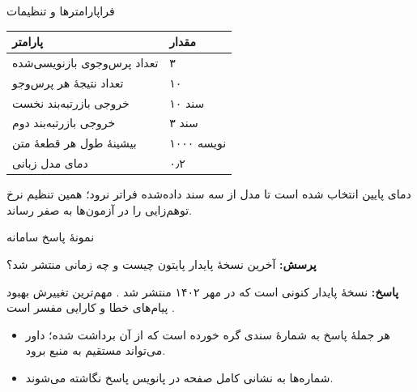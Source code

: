 \begin{frame}[noframenumbering]{فراپارامترها و تنظیمات}
  \begin{center}
    \small
    \begin{tabular}{@{}ll@{}}
      \toprule
      پارامتر & مقدار \\
      \midrule
      تعداد پرس‌وجوی بازنویسی‌شده          & ۳ \\
      تعداد نتیجهٔ هر پرس‌وجو              & ۱۰ \\
      خروجی بازرتبه‌بند نخست               & ۱۰ سند \\
      خروجی بازرتبه‌بند دوم                & ۳ سند \\
      بیشینهٔ طول هر قطعهٔ متن             & ۱۰۰۰ نویسه \\
      دمای مدل زبانی                       & ۰٫۲ \\
      \bottomrule
    \end{tabular}
  \end{center}

  \begin{PTnote}
    دمای پایین انتخاب شده است تا مدل از سه سند داده‌شده فراتر نرود؛ همین تنظیم
    نرخ توهم‌زایی را در آزمون‌ها به صفر رساند.
  \end{PTnote}
\end{frame}

\begin{frame}[noframenumbering]{نمونهٔ پاسخ سامانه}
  \begin{PTexample}
    \textbf{پرسش:} آخرین نسخهٔ پایدار پایتون چیست و چه زمانی منتشر شد؟

    \medskip
    \textbf{پاسخ:} نسخهٔ پایدار کنونی  است \soft{[۱]} که در
    مهر ۱۴۰۲ منتشر شد \soft{[۲]}. مهم‌ترین تغییرش بهبود پیام‌های خطا و
    کارایی مفسر است \soft{[۱]}.
  \end{PTexample}

  \begin{itemize}
    \item هر جملهٔ پاسخ به شمارهٔ سندی گره خورده است که از آن برداشت شده؛ داور
          می‌تواند مستقیم به منبع برود.
    \item شماره‌ها به نشانی کامل صفحه در پانویس پاسخ نگاشته می‌شوند.
  \end{itemize}
\end{frame}

